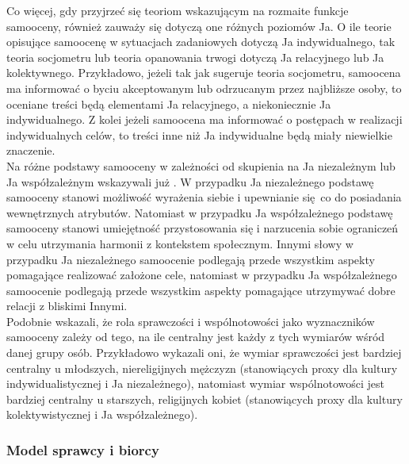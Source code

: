 \documentclass[man]{apa6}
\begin{document}
Co więcej, gdy przyjrzeć się teoriom wskazującym na rozmaite funkcje samooceny, również zauważy się dotyczą one różnych poziomów Ja. O ile teorie opisujące samoocenę w sytuacjach zadaniowych \parencite[np., ][]{bandura1994self} dotyczą Ja indywidualnego, tak teoria socjometru \parencite{leary1995self} lub teoria opanowania trwogi \parencite{pyszczynski2004people} dotyczą Ja relacyjnego lub Ja kolektywnego. Przykładowo, jeżeli tak jak sugeruje teoria socjometru, samoocena ma informować o byciu akceptowanym lub odrzucanym przez najbliższe osoby, to oceniane treści będą elementami Ja relacyjnego, a niekoniecznie Ja indywidualnego. Z kolei jeżeli samoocena ma informować o postępach w realizacji indywidualnych celów, to treści inne niż Ja indywidualne będą miały niewielkie znaczenie.\\

Na różne podstawy samooceny w zależności od skupienia na Ja niezależnym lub Ja współzależnym wskazywali już \textcite{markus1991culture}. W przypadku Ja niezależnego podstawę samooceny stanowi możliwość wyrażenia siebie i upewnianie się co do posiadania wewnętrznych atrybutów. Natomiast w przypadku Ja współzależnego podstawę samooceny stanowi umiejętność przystosowania się i narzucenia sobie ograniczeń w celu utrzymania harmonii z kontekstem społecznym. Innymi słowy w przypadku Ja niezależnego samoocenie podlegają przede wszystkim aspekty pomagające realizować założone cele, natomiast w przypadku Ja współzależnego samoocenie podlegają przede wszystkim aspekty pomagające utrzymywać dobre relacji z bliskimi Innymi.\\

Podobnie \textcite{gebauer2013agency} wskazali, że rola sprawczości i wspólnotowości jako wyznaczników samooceny zależy od tego, na ile centralny jest każdy z tych wymiarów wśród danej grupy osób. Przykładowo wykazali oni, że wymiar sprawczości jest bardziej centralny u młodszych, niereligijnych mężczyzn (stanowiących proxy dla kultury indywidualistycznej i Ja niezależnego), natomiast wymiar wspólnotowości jest bardziej centralny u starszych, religijnych kobiet (stanowiących proxy dla kultury kolektywistycznej i Ja współzależnego).\\

\subsubsection{Model sprawcy i biorcy \parencite{wojciszke2006perspektywa}}
\end{document}
